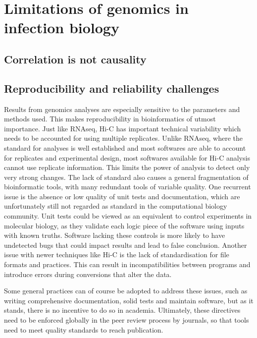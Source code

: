 
\chapter{Limitations of genomics in infection biology} %

\label{ch:03-01} %



\section{Correlation is not causality}


\section{Reproducibility and reliability challenges}
Results from genomics analyses are especially sensitive to the parameters and methods used. This makes reproducibility in bioinformatics of utmost importance. Just like RNAseq, Hi-C has important technical variability which needs to be accounted for using multiple replicates.
Unlike RNAseq, where the standard for analyses is well established and most softwares are able to account for replicates and experimental design, most softwares available for Hi-C analysis cannot use replicate information. This limits the power of analysis to detect only very strong changes. The lack of standard also causes a general fragmentation of bioinformatic tools, with many redundant tools of variable quality. One recurrent issue is the absence or low quality of unit tests and documentation, which are unfortunately still not regarded as standard in the computational biology community. Unit tests could be viewed as an equivalent to control experiments in molecular biology, as they validate each logic piece of the software using inputs with known truths. Software lacking these controls is more likely to have undetected bugs that could impact results and lead to false conclusion.
Another issue with newer techniques like Hi-C is the lack of standardisation for file formats and practices. This can result in incompatibilities between programs and introduce errors during conversions that alter the data.

Some general practices can of course be adopted to address these issues, such as writing comprehensive documentation, solid tests and maintain software, but as it stands, there is no incentive to do so in academia. Ultimately, these directives need to be enforced globally in the peer review process by journals, so that tools need to meet quality standards to reach publication.

